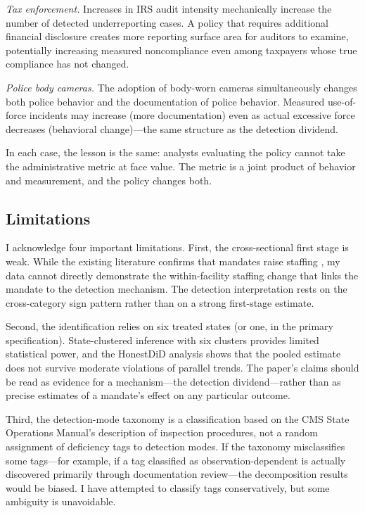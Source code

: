 \documentclass[12pt]{article}
\begin{document}
\textit{Tax enforcement.} Increases in IRS audit intensity mechanically increase the number of detected underreporting cases. A policy that requires additional financial disclosure creates more reporting surface area for auditors to examine, potentially increasing measured noncompliance even among taxpayers whose true compliance has not changed.

\textit{Police body cameras.} The adoption of body-worn cameras simultaneously changes both police behavior and the documentation of police behavior. Measured use-of-force incidents may increase (more documentation) even as actual excessive force decreases (behavioral change)---the same structure as the detection dividend.

In each case, the lesson is the same: analysts evaluating the policy cannot take the administrative metric at face value. The metric is a joint product of behavior and measurement, and the policy changes both.

\subsection{Limitations}

I acknowledge four important limitations. First, the cross-sectional first stage is weak. While the existing literature confirms that mandates raise staffing \citep{bowblis2011, matsudaira2014, werner2026}, my data cannot directly demonstrate the within-facility staffing change that links the mandate to the detection mechanism. The detection interpretation rests on the cross-category sign pattern rather than on a strong first-stage estimate.

Second, the identification relies on six treated states (or one, in the primary specification). State-clustered inference with six clusters provides limited statistical power, and the HonestDiD analysis shows that the pooled estimate does not survive moderate violations of parallel trends. The paper's claims should be read as evidence for a mechanism---the detection dividend---rather than as precise estimates of a mandate's effect on any particular outcome.

Third, the detection-mode taxonomy is a classification based on the CMS State Operations Manual's description of inspection procedures, not a random assignment of deficiency tags to detection modes. If the taxonomy misclassifies some tags---for example, if a tag classified as observation-dependent is actually discovered primarily through documentation review---the decomposition results would be biased. I have attempted to classify tags conservatively, but some ambiguity is unavoidable.
\end{document}
